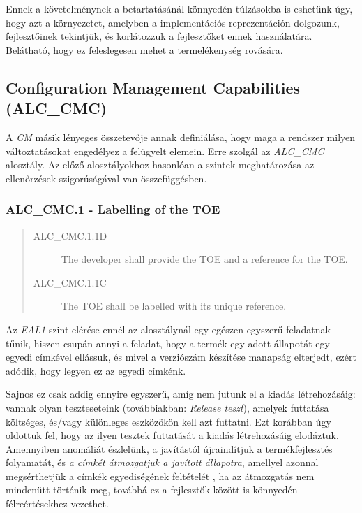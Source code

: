 Ennek a követelménynek a betartatásánál könnyedén túlzásokba is eshetünk úgy, hogy azt
a környezetet, amelyben a implementációs reprezentáción dolgozunk, fejlesztőinek tekintjük, és
korlátozzuk a fejlesztőket ennek használatára. Belátható, hogy ez feleslegesen mehet
a termelékenység rovására.

\pagebreak[3]
\subsection{Configuration Management Capabilities (ALC\_CMC)}

A \emph{CM} másik lényeges összetevője annak definiálása, hogy maga a rendszer milyen
változtatásokat engedélyez a felügyelt elemein. Erre szolgál az \emph{ALC\_CMC} alosztály.
Az előző alosztályokhoz hasonlóan a szintek meghatározása az ellenőrzések szigorúságával van
összefüggésben.

\subsubsection{ALC\_CMC.1 - Labelling of the TOE}
\begin{quote}
    \begin{description}
        \item[ALC\_CMC.1.1D]{The developer shall provide the TOE and a reference for the TOE.}
        \item[ALC\_CMC.1.1C]{The TOE shall be labelled with its unique reference.}
    \end{description}
\end{quote}

Az \emph{EAL1} szint elérése ennél az alosztálynál egy egészen egyszerű feladatnak tűnik, hiszen
csupán annyi a feladat, hogy a termék egy adott állapotát egy egyedi címkével ellássuk, és mivel
a verziószám készítése manapság elterjedt, ezért adódik, hogy legyen ez az egyedi címkénk.

Sajnos ez csak addig ennyire egyszerű, amíg nem jutunk el a kiadás létrehozásáig: vannak olyan
teszteseteink (továbbiakban: \emph{Release teszt}), amelyek futtatása költséges, és/vagy különleges
eszközökön kell azt futtatni. Ezt korábban úgy oldottuk fel, hogy az ilyen tesztek futtatását
a kiadás létrehozásáig elodáztuk.  Amennyiben anomáliát észlelünk, a javítástól újraindítjuk
a termékfejlesztés folyamatát, és \emph{a címkét átmozgatjuk a javított állapotra}, amellyel azonnal
megsérthetjük a címkék egyediségének feltételét , ha az átmozgatás nem mindenütt történik meg,
továbbá ez a fejlesztők között is könnyedén félreértésekhez vezethet.

